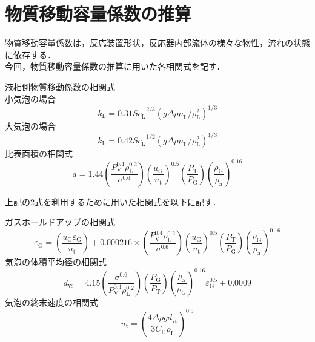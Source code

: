 \documentclass[a4j]{jsreport}
\begin{document}
\section{物質移動容量係数の推算}
物質移動容量係数は，反応装置形状，反応器内部流体の様々な物性，流れの状態に依存する．\\
今回，物質移動容量係数の推算に用いた各相関式を記す．
\par
液相側物質移動係数の相関式\\
小気泡の場合
\begin{equation}
    k_\mathrm{L} = 0.31Sc_\mathrm{L}^{-2/3}(g \varDelta \rho \mu_\mathrm{L}/\rho_\mathrm{L}^2)^{1/3}
\end{equation}
大気泡の場合
\begin{equation}
    k_\mathrm{L} = 0.42Sc_\mathrm{L}^{-1/2}(g \varDelta \rho \mu_\mathrm{L}/\rho_\mathrm{L}^2)^{1/3}
\end{equation}
比表面積の相関式
\begin{equation}
    a = 1.44 \left( \frac{P_\mathrm{V}^{0.4} \rho_\mathrm{L}^{0.2} }{ \sigma^{0.6}} \right) \left( \frac{u_\mathrm{G}}{u_\mathrm{t}} \right)^{0.5} \left( \frac{P_\mathrm{T}}{P_\mathrm{G}} \right) \left( \frac{\rho_\mathrm{G}}{\rho_\mathrm{a}} \right)^{0.16}
\end{equation}

上記の2式を利用するために用いた相関式を以下に記す．

ガスホールドアップの相関式
\begin{equation}
    \varepsilon_{{\mathrm G}} = \left( \frac{u_{{\mathrm G}}\varepsilon_{{\mathrm G}}}{u_{{\mathrm t}}} \right) + 0.000216 \times \left( \frac{P_\mathrm{V}^{0.4} \rho_\mathrm{L}^{0.2} }{ \sigma^{0.6}} \right) \left( \frac{u_\mathrm{G}}{u_\mathrm{t}} \right)^{0.5} \left( \frac{P_\mathrm{T}}{P_\mathrm{G}} \right) \left( \frac{\rho_\mathrm{G}}{\rho_\mathrm{a}} \right)^{0.16}
\end{equation}
気泡の体積平均径の相関式
\begin{equation}
    d_\mathrm{vs} = 4.15 \left( \frac{\sigma^{0.6}}{P_\mathrm{V}^{0.4} \rho_\mathrm{L}^{0.2}} \right) \left( \frac{P_\mathrm{G}}{P_\mathrm{T}} \right) \left( \frac{\rho_\mathrm{a}}{\rho_\mathrm{G}} \right) ^{0.16} \varepsilon_\mathrm{G}^{0.5} + 0.0009
{}\end{equation}
気泡の終末速度の相関式
\begin{equation}
    u_\mathrm{t} = \left( \frac{4\varDelta \rho g d_\mathrm{vs}}{3C_\mathrm{D} \rho_\mathrm{L}} \right)^{0.5}
\end{equation}
\end{document}
